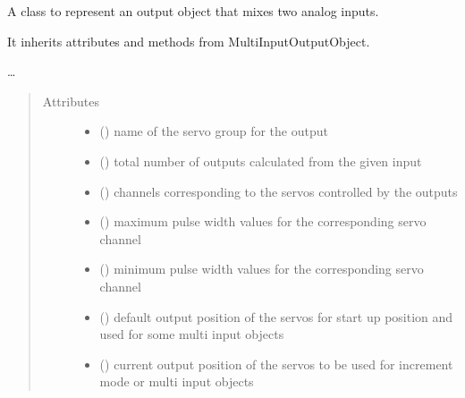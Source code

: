 \documentclass[letterpaper,10pt,english]{sphinxmanual}
\begin{document}
\begin{fulllineitems}
\label{\detokenize{generic:AnalogMixerOutput.AnalogMixerOutput}}
\sphinxAtStartPar
A class to represent an output object that mixes two analog inputs.

\sphinxAtStartPar
It inherits attributes and methods from MultiInputOutputObject.

\sphinxAtStartPar
…
\begin{quote}\begin{description}
\item[{Attributes}] \leavevmode\begin{itemize}
\item {} 
\sphinxAtStartPar
{}() \textendash{} name of the servo group for the output

\item {} 
\sphinxAtStartPar
{}() \textendash{} total number of outputs 
calculated from the given input

\item {} 
\sphinxAtStartPar
{}(\sphinxstyleemphasis{{[}int{]}}) \textendash{} channels corresponding to 
the servos controlled by the outputs

\item {} 
\sphinxAtStartPar
{}(\sphinxstyleemphasis{{[}int{]}}) \textendash{} maximum pulse width values 
for the corresponding servo channel

\item {} 
\sphinxAtStartPar
{}(\sphinxstyleemphasis{{[}int{]}}) \textendash{} minimum pulse width values 
for the corresponding servo channel

\item {} 
\sphinxAtStartPar
{}(\sphinxstyleemphasis{{[}int{]}}) \textendash{} default output position of 
the servos for start up position and used for some multi input 
objects

\item {} 
\sphinxAtStartPar
{}(\sphinxstyleemphasis{{[}int{]}}) \textendash{} current output position of the 
servos to be used for increment mode or multi input objects


\end{itemize}
\end{description}
\end{quote}
\end{fulllineitems}
\end{document}
